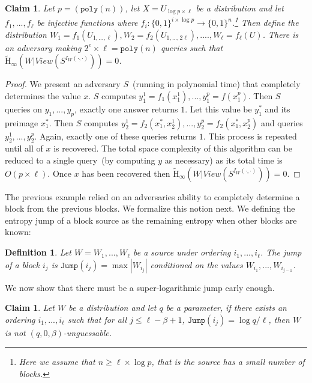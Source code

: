 \documentclass[11pt]{article}
\newcommand{\zo}{\ensuremath{\{0, 1\}}}
\newcommand{\poly}{\ensuremath{\mathtt{poly}}\xspace}
\newcommand{\Hav}{\tilde{\mathrm{H}}_\infty}
\newtheorem{definition}[theorem]{Definition}
\newtheorem{claim}[theorem]{Claim}
\begin{document}
\begin{claim}
Let $p = (\poly(n))$, let $X = U_{\log p\times \ell}$ be a distribution and let $f_1,..., f_{\ell}$ be injective functions where $f_i:\zo^{i\times \log p}\rightarrow \zo^n$.\footnote{Here we assume that $n\ge \ell \times \log p$, that is the source has a small number of blocks.}  Then define the distribution $W_1 = f_1(U_{1,...,\ell}), W_2 = f_2(U_{1,..., 2\ell}),...., W_\ell = f_\ell(U)$.  There is an adversary making $2^e\times \ell = \poly(n)$ queries such that $\Hav(W | View(S^{I_W(\cdot, \cdot)})) = 0$.
\end{claim}
\begin{proof}
We present an adversary $S$~(running in polynomial time) that completely determines the value $x$.  $S$ computes $y_1^1 = f_1(x_1^1),..., y_1^p = f(x_1^p)$.  Then $S$ queries on $y_1,..., y_p$, exactly one answer returns $1$.  Let this value be $y_1^*$ and its preimage $x_1^*$.  Then $S$ computes $y_2^1 = f_2(x_1^*,x_2^1), ..., y_2^p= f_2(x_1^*, x_2^p)$ and queries $y_2^1,..., y_2^p$.  Again, exactly one of these queries returns $1$.  This process is repeated until all of $x$ is recovered.  The total space complexity of this algorithm can be reduced to a single query~(by computing $y$ as necessary) as its total time is $O(p\times \ell)$.  Once $x$ has been recovered then $\Hav(W | View(S^{I_W(\cdot, \cdot)})) = 0$.
\end{proof}

The previous example relied on an adversaries ability to completely determine a block from the previous blocks.  We formalize this notion next.  We defining the entropy jump of a block source as the remaining entropy when other blocks are known:

\begin{definition}
Let $W = W_1,..., W_\ell$ be a source under ordering $i_1,..., i_\ell$.  The \emph{jump} of a block $i_j$ is $\mathtt{Jump}(i_j) = \max|W_{i_j} |$ conditioned on the values $W_{i_1},..., W_{i_{j-1}}$.
\end{definition}

\noindent
We now show that there must be a super-logarithmic jump early enough.

\begin{claim}
Let $W$ be a distribution and let $q$ be a parameter, if there exists an ordering $i_1,..., i_\ell$ such that for all $j\le \ell-\beta +1$, $\mathtt{Jump}(i_j) = \log q /\ell$, then $W$ is not $(q, 0, \beta)$-unguessable.
\end{claim}
\end{document}
